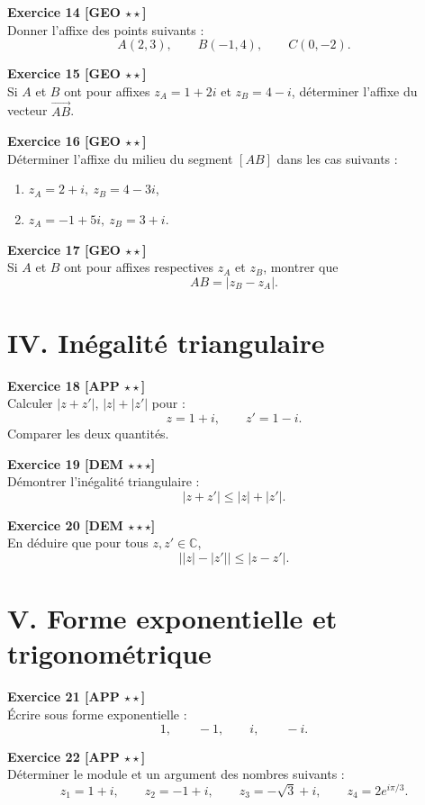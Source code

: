\documentclass[11pt,a4paper]{article}
\newcommand{\C}{\mathbb{C}}
\begin{document}
\textbf{Exercice 14 [GEO $\star\star$]}\\
Donner l’affixe des points suivants :
\[
A(2,3),\qquad B(-1,4),\qquad C(0,-2).
\]

\textbf{Exercice 15 [GEO $\star\star$]}\\
Si \(A\) et \(B\) ont pour affixes \(z_A=1+2i\) et \(z_B=4-i\), déterminer l’affixe du vecteur \(\overrightarrow{AB}\).

\textbf{Exercice 16 [GEO $\star\star$]}\\
Déterminer l’affixe du milieu du segment \([AB]\) dans les cas suivants :
\begin{enumerate}[label=\alph*)]
    \item \(z_A=2+i,\ z_B=4-3i\),
    \item \(z_A=-1+5i,\ z_B=3+i\).
\end{enumerate}

\textbf{Exercice 17 [GEO $\star\star$]}\\
Si \(A\) et \(B\) ont pour affixes respectives \(z_A\) et \(z_B\), montrer que
\[
AB=|z_B-z_A|.
\]

\section*{IV. Inégalité triangulaire}

\textbf{Exercice 18 [APP $\star\star$]}\\
Calculer \(|z+z'|\), \(|z|+|z'|\) pour :
\[
z=1+i,\qquad z'=1-i.
\]
Comparer les deux quantités.

\textbf{Exercice 19 [DEM $\star\star\star$]}\\
Démontrer l’inégalité triangulaire :
\[
|z+z'|\le |z|+|z'|.
\]

\textbf{Exercice 20 [DEM $\star\star\star$]}\\
En déduire que pour tous \(z,z'\in\C\),
\[
\big||z|-|z'|\big|\le |z-z'|.
\]

\section*{V. Forme exponentielle et trigonométrique}

\textbf{Exercice 21 [APP $\star\star$]}\\
Écrire sous forme exponentielle :
\[
1,\qquad -1,\qquad i,\qquad -i.
\]

\textbf{Exercice 22 [APP $\star\star$]}\\
Déterminer le module et un argument des nombres suivants :
\[
z_1=1+i,\qquad z_2=-1+i,\qquad z_3=-\sqrt{3}+i,\qquad z_4=2e^{i\pi/3}.
\]
\end{document}
